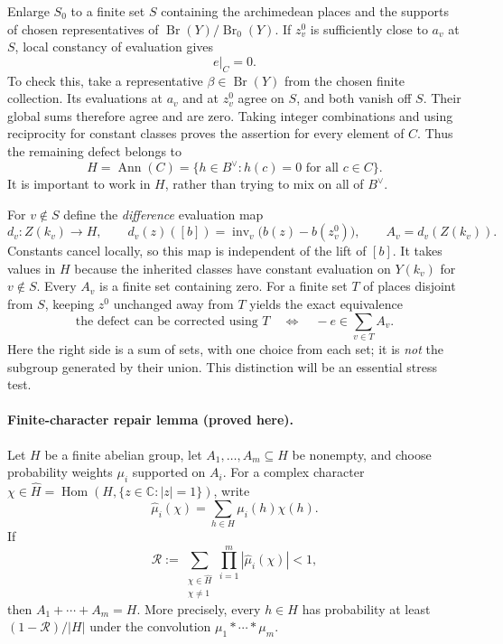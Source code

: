 \documentclass[11pt]{article}
\newcommand{\C}{\mathbb{C}}
\begin{document}
Enlarge $S_0$ to a finite set $S$ containing the archimedean places and the
supports of chosen representatives of
$\operatorname{Br}(Y)/\operatorname{Br}_0(Y)$.  If $z_v^0$ is sufficiently close
to $a_v$ at $S$, local constancy of evaluation gives
\[
 e|_C=0.
\]
To check this, take a representative $\beta\in\operatorname{Br}(Y)$ from the
chosen finite collection.  Its evaluations at $a_v$ and at $z_v^0$ agree on
$S$, and both vanish off $S$.  Their global sums therefore agree and are zero.
Taking integer combinations and using reciprocity for constant classes proves
the assertion for every element of $C$.  Thus the remaining defect belongs to
\[
 H=\operatorname{Ann}(C)=\{h\in B^\vee:h(c)=0\text{ for all }c\in C\}.
\]
It is important to work in $H$, rather than trying to mix on all of $B^\vee$.

For $v\notin S$ define the \emph{difference} evaluation map
\begin{equation}\label{ra30003827:local-difference}
 d_v:Z(k_v)\longrightarrow H,\qquad
 d_v(z)([b])=\operatorname{inv}_v\bigl(b(z)-b(z_v^0)\bigr),
 \qquad A_v=d_v(Z(k_v)).
\end{equation}
Constants cancel locally, so this map is independent of the lift of $[b]$.
It takes values in $H$ because the inherited classes have constant evaluation
on $Y(k_v)$ for $v\notin S$.  Every $A_v$ is a finite set containing zero.
For a finite set $T$ of places disjoint from $S$, keeping $z^0$ unchanged away
from $T$ yields the exact equivalence
\begin{equation}\label{ra30003827:sumset}
 \text{the defect can be corrected using $T$}
 \quad\Longleftrightarrow\quad
 -e\in\sum_{v\in T}A_v.
\end{equation}
Here the right side is a sum of sets, with one choice from each set; it is
\emph{not} the subgroup generated by their union.  This distinction will be
an essential stress test.

\paragraph{Finite-character repair lemma (proved here).}
Let $H$ be a finite abelian group, let $A_1,\ldots,A_m\subseteq H$ be nonempty,
and choose probability weights $\mu_i$ supported on $A_i$.  For a complex
character $\chi\in\widehat H=\operatorname{Hom}(H,\{z\in\C:|z|=1\})$, write
\[
 \widehat\mu_i(\chi)=\sum_{h\in H}\mu_i(h)\chi(h).
\]
If
\begin{equation}\label{ra30003827:fourier-condition}
 \mathcal R:=\sum_{\substack{\chi\in\widehat H\\\chi\ne1}}
                  \prod_{i=1}^m|\widehat\mu_i(\chi)|<1,
\end{equation}
then $A_1+\cdots+A_m=H$.  More precisely, every $h\in H$ has probability at
least $(1-\mathcal R)/|H|$ under the convolution $\mu_1*\cdots*\mu_m$.
\end{document}
